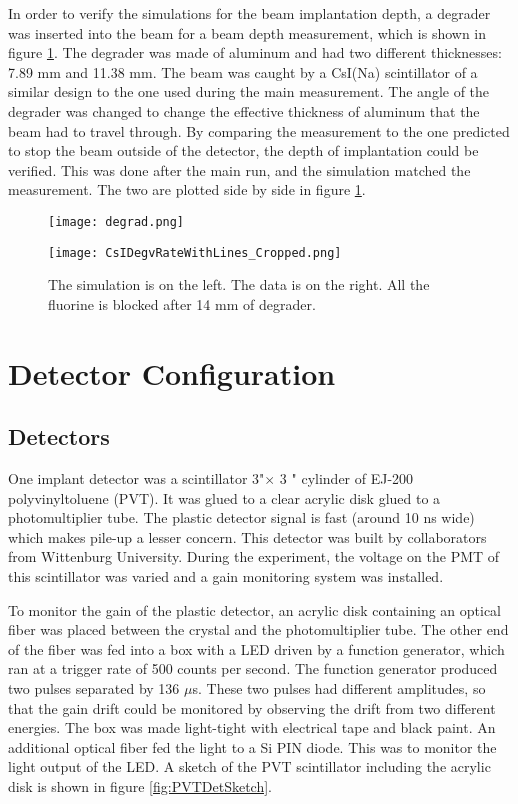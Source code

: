 \documentclass[../MaxHughesThesis.tex]{subfiles}
\begin{document}
In order to verify the simulations for the beam implantation depth, a degrader was inserted into the beam for a beam depth measurement, which is shown in figure \ref{fig:degraderdata}.
The degrader was made of aluminum and had two different thicknesses: 7.89 mm and 11.38 mm. 
The beam was caught by a CsI(Na) scintillator of a similar design to the one used during the main measurement.
The angle of the degrader was changed to change the effective thickness of aluminum that the beam had to travel through. 
By comparing the measurement to the one predicted to stop the beam outside of the detector, the depth of implantation could be verified. 
This was done after the main run, and the simulation matched the measurement.
The two are plotted side by side in figure \ref{fig:degraderdata}.

\begin{figure}
    \centering
    \begin{minipage}{0.50\textwidth}
	\centerline{\texttt{[image: degrad.png]}}
    \end{minipage}\hfill
    \begin{minipage}{0.50\textwidth}
	\centerline{\texttt{[image: CsIDegvRateWithLines\_Cropped.png]}}
    \end{minipage}
	\caption{The simulation is on the left.
		 The data is on the right.
		 All the fluorine is blocked after 14 mm of degrader.}
	\label{fig:degraderdata}
\end{figure}


\section{Detector Configuration}

\subsection{Detectors}
One implant detector was a scintillator 3"\diameter $\times$  3 " cylinder of EJ-200 polyvinyltoluene (PVT).
It was glued to a clear acrylic disk glued to a photomultiplier tube.
The plastic detector signal is fast (around 10 ns wide) which makes pile-up a lesser concern.
This detector was built by collaborators from Wittenburg University.
During the experiment, the voltage on the PMT of this scintillator was varied and a gain monitoring system was installed.

To monitor the gain of the plastic detector, an acrylic disk containing an optical fiber was placed between the crystal and the photomultiplier tube. 
The other end of the fiber was fed into a box with a LED driven by a function generator, which ran at a trigger rate of 500 counts per second. 
The function generator produced two pulses separated by 136 $\mu$s.
These two pulses had different amplitudes, so that the gain drift could be monitored by observing the drift from two different energies.
The box was made light-tight with electrical tape and black paint.
An additional optical fiber fed the light to a Si PIN diode.
This was to monitor the light output of the LED.
A sketch of the PVT scintillator including the acrylic disk is shown in figure \ref{fig:PVTDetSketch}.
\end{document}
